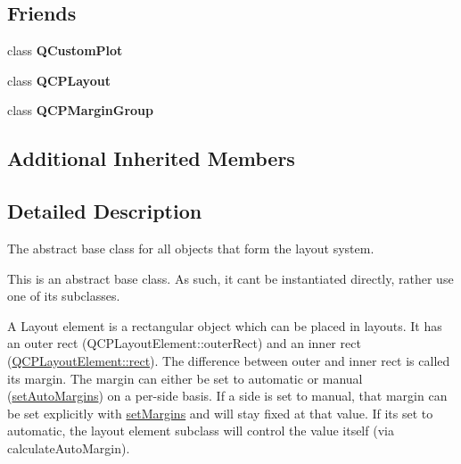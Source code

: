 \subsection*{Friends}
\begin{DoxyCompactItemize}
\item 
class {\bfseries Q\+Custom\+Plot}\hypertarget{class_q_c_p_layout_element_a00f8b42d059625f815808a7cc99c2f04}{}\label{class_q_c_p_layout_element_a00f8b42d059625f815808a7cc99c2f04}

\item 
class {\bfseries Q\+C\+P\+Layout}\hypertarget{class_q_c_p_layout_element_afe4c91a11f68a5f9a95da0b259cb392f}{}\label{class_q_c_p_layout_element_afe4c91a11f68a5f9a95da0b259cb392f}

\item 
class {\bfseries Q\+C\+P\+Margin\+Group}\hypertarget{class_q_c_p_layout_element_aa155fa6e391f4abef89b33a960ece174}{}\label{class_q_c_p_layout_element_aa155fa6e391f4abef89b33a960ece174}

\end{DoxyCompactItemize}
\subsection*{Additional Inherited Members}


\subsection{Detailed Description}
The abstract base class for all objects that form the layout system. 

This is an abstract base class. As such, it can\textquotesingle{}t be instantiated directly, rather use one of its subclasses.

A Layout element is a rectangular object which can be placed in layouts. It has an outer rect (Q\+C\+P\+Layout\+Element\+::outer\+Rect) and an inner rect (\hyperlink{class_q_c_p_layout_element_affdfea003469aac3d0fac5f4e06171bc}{Q\+C\+P\+Layout\+Element\+::rect}). The difference between outer and inner rect is called its margin. The margin can either be set to automatic or manual (\hyperlink{class_q_c_p_layout_element_accfda49994e3e6d51ed14504abf9d27d}{set\+Auto\+Margins}) on a per-\/side basis. If a side is set to manual, that margin can be set explicitly with \hyperlink{class_q_c_p_layout_element_a8f450b1f3f992ad576fce2c63d8b79cf}{set\+Margins} and will stay fixed at that value. If it\textquotesingle{}s set to automatic, the layout element subclass will control the value itself (via calculate\+Auto\+Margin).

